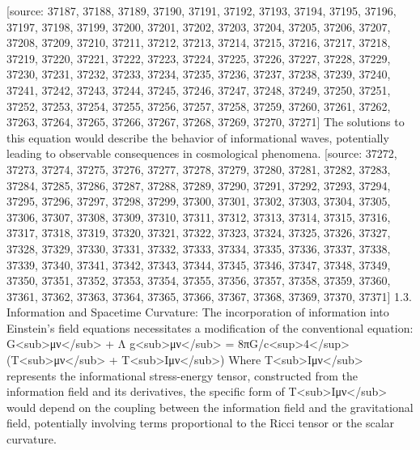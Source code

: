 \documentclass[12pt]{article}
\begin{document}
[source: 37187, 37188, 37189, 37190, 37191, 37192, 37193, 37194, 37195, 37196, 37197, 37198, 37199, 37200, 37201, 37202, 37203, 37204, 37205, 37206, 37207, 37208, 37209, 37210, 37211, 37212, 37213, 37214, 37215, 37216, 37217, 37218, 37219, 37220, 37221, 37222, 37223, 37224, 37225, 37226, 37227, 37228, 37229, 37230, 37231, 37232, 37233, 37234, 37235, 37236, 37237, 37238, 37239, 37240, 37241, 37242, 37243, 37244, 37245, 37246, 37247, 37248, 37249, 37250, 37251, 37252, 37253, 37254, 37255, 37256, 37257, 37258, 37259, 37260, 37261, 37262, 37263, 37264, 37265, 37266, 37267, 37268, 37269, 37270, 37271] The solutions to this equation would describe the behavior of informational waves, potentially leading to observable consequences in cosmological phenomena.
[source: 37272, 37273, 37274, 37275, 37276, 37277, 37278, 37279, 37280, 37281, 37282, 37283, 37284, 37285, 37286, 37287, 37288, 37289, 37290, 37291, 37292, 37293, 37294, 37295, 37296, 37297, 37298, 37299, 37300, 37301, 37302, 37303, 37304, 37305, 37306, 37307, 37308, 37309, 37310, 37311, 37312, 37313, 37314, 37315, 37316, 37317, 37318, 37319, 37320, 37321, 37322, 37323, 37324, 37325, 37326, 37327, 37328, 37329, 37330, 37331, 37332, 37333, 37334, 37335, 37336, 37337, 37338, 37339, 37340, 37341, 37342, 37343, 37344, 37345, 37346, 37347, 37348, 37349, 37350, 37351, 37352, 37353, 37354, 37355, 37356, 37357, 37358, 37359, 37360, 37361, 37362, 37363, 37364, 37365, 37366, 37367, 37368, 37369, 37370, 37371] 1.3. Information and Spacetime Curvature:
The incorporation of information into Einstein's field equations necessitates a modification of the conventional equation:
G<sub>μν</sub> + Λ g<sub>μν</sub> = 8πG/c<sup>4</sup> (T<sub>μν</sub> + T<sub>Iμν</sub>)
Where T<sub>Iμν</sub> represents the informational stress-energy tensor, constructed from the information field and its derivatives, the specific form of T<sub>Iμν</sub> would depend on the coupling between the information field and the gravitational field, potentially involving terms proportional to the Ricci tensor or the scalar curvature.
\end{document}
